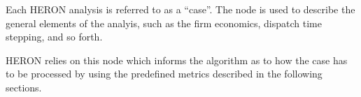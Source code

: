 Each HERON analysis is referred to as a ``case''. The  node is used to describe the
general elements of the analyis, such as the firm economics, dispatch time stepping, and so forth.

HERON relies on this  node which informs the algorithm as to how the case has to be
processed by using the predefined metrics described in the following sections.
